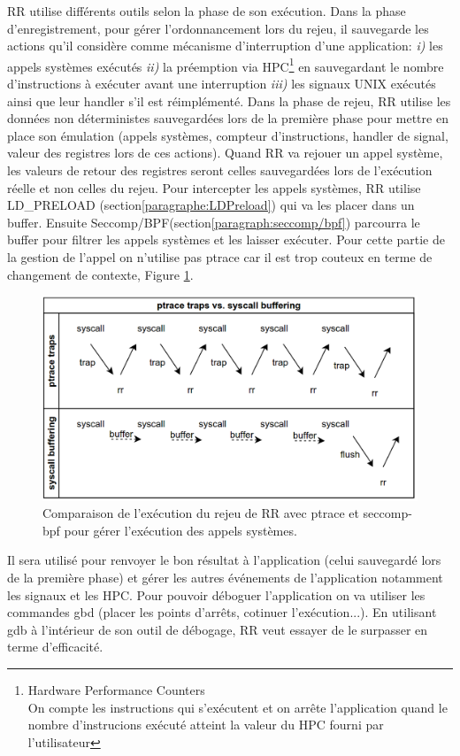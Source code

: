 RR utilise différents outils selon la phase de son
exécution\citep{RRimplem}. Dans la phase d'enregistrement, pour gérer
l'ordonnancement lors du rejeu, il sauvegarde les actions qu'il considère comme
mécanisme d'interruption d'une application: \textit{i)} les appels systèmes
exécutés \textit{ii)} la préemption via HPC\footnote{Hardware Performance
  Counters \\ On compte les instructions qui s'exécutent et on arrête
  l'application quand le nombre d'instrucions exécuté atteint la valeur du HPC
  fourni par l'utilisateur} en sauvegardant le nombre d'instructions à exécuter
avant une interruption \textit{iii)} les signaux UNIX exécutés ainsi que leur
handler s'il est réimplémenté. Dans la phase de rejeu, RR utilise les données
non déterministes sauvegardées lors de la première phase pour mettre en place
son émulation (appels systèmes, compteur d'instructions, handler de signal,
valeur des registres lors de ces actions). Quand RR va rejouer un appel système,
les valeurs de retour des registres seront celles sauvegardées lors de
l'exécution réelle et non celles du rejeu. Pour intercepter les appels systèmes,
RR utilise LD\_PRELOAD (section\ref{paragraphe:LDPreload}) qui va les placer
dans un buffer. Ensuite Seccomp/BPF(section\ref{paragraph:seccomp/bpf})
parcourra le buffer pour filtrer les appels systèmes et les laisser
exécuter. Pour cette partie de la gestion de l'appel on n'utilise pas ptrace car
il est trop couteux en terme de changement de contexte, Figure \ref{AS_RR}.
\begin{figure}
\centering \includegraphics[scale=0.30]{Pictures/png/RR_AS}
\caption{Comparaison de l'exécution du rejeu de RR avec ptrace et seccomp-bpf
  pour gérer l'exécution des appels systèmes.}
\label{AS_RR}
\end{figure}
Il sera utilisé pour renvoyer le bon résultat à l'application (celui sauvegardé
lors de la première phase) et gérer les autres événements de l'application
notamment les signaux et les HPC. Pour pouvoir déboguer l'application on va
utiliser les commandes gbd (placer les points d'arrêts, cotinuer
l'exécution...). En utilisant gdb à l'intérieur de son outil de débogage, RR
veut essayer de le surpasser en terme d'efficacité.

